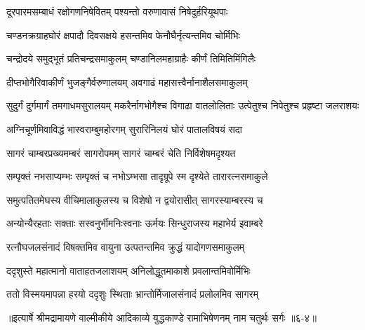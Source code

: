 \twolineshloka
{दूरपारमसम्बाधं रक्षोगणनिषेवितम्}
{पश्यन्तो वरुणावासं निषेदुर्हरियूथपाः} %

\twolineshloka
{चण्डनक्रग्राहघोरं क्षपादौ दिवसक्षये}
{हसन्तमिव फेनौघैर्नृत्यन्तमिव चोर्मिभिः} %

\twolineshloka
{चन्द्रोदये समुद्भूतं प्रतिचन्द्रसमाकुलम्}
{चण्डानिलमहाग्राहैः कीर्णं तिमितिमिंगिलैः} %

\twolineshloka
{दीप्तभोगैरिवाकीर्णं भुजङ्गैर्वरुणालयम्}
{अवगाढं महासत्त्वैर्नानाशैलसमाकुलम्} %

\threelineshloka
{सुदुर्गं दुर्गमार्गं तमगाधमसुरालयम्}
{मकरैर्नागभोगैश्च विगाढा वातलोलिताः}
{उत्पेतुश्च निपेतुश्च प्रहृष्टा जलराशयः} %

\twolineshloka
{अग्निचूर्णमिवाविद्धं भास्वराम्बुमहोरगम्}
{सुरारिनिलयं घोरं पातालविषयं सदा} %

\twolineshloka
{सागरं चाम्बरप्रख्यमम्बरं सागरोपमम्}
{सागरं चाम्बरं चेति निर्विशेषमदृश्यत} %

\twolineshloka
{सम्पृक्तं नभसाप्यम्भः सम्पृक्तं च नभोऽम्भसा}
{तादृग्रूपे स्म दृश्येते तारारत्नसमाकुले} %

\twolineshloka
{समुत्पतितमेघस्य वीचिमालाकुलस्य च}
{विशेषो न द्वयोरासीत् सागरस्याम्बरस्य च} %

\twolineshloka
{अन्योन्यैरहताः सक्ताः सस्वनुर्भीमनिःस्वनाः}
{ऊर्मयः सिन्धुराजस्य महाभेर्य इवाम्बरे} %

\twolineshloka
{रत्नौघजलसंनादं विषक्तमिव वायुना}
{उत्पतन्तमिव क्रुद्धं यादोगणसमाकुलम्} %

\twolineshloka
{ददृशुस्ते महात्मानो वाताहतजलाशयम्}
{अनिलोद्धूतमाकाशे प्रवलान्तमिवोर्मिभिः} %

\twolineshloka
{ततो विस्मयमापन्ना हरयो ददृशुः स्थिताः}
{भ्रान्तोर्मिजालसंनादं प्रलोलमिव सागरम्} %


॥इत्यार्षे श्रीमद्रामायणे वाल्मीकीये आदिकाव्ये युद्धकाण्डे रामाभिषेणनम् नाम चतुर्थः सर्गः ॥६-४॥
